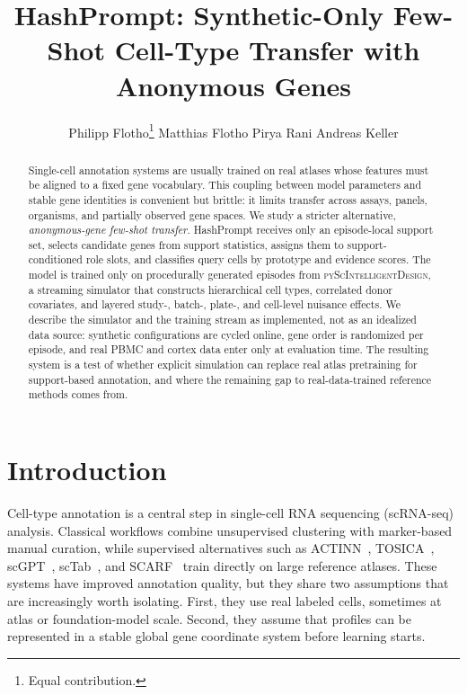 \documentclass{article}
\title{HashPrompt: Synthetic-Only Few-Shot Cell-Type Transfer with Anonymous Genes}
\author{%
  Philipp Flotho\thanks{Equal contribution.}
  \And
  Matthias Flotho\footnotemark[1]
  \And
  Pirya Rani
  \And
  Andreas Keller
}
\begin{document}
\maketitle

\begin{abstract}
Single-cell annotation systems are usually trained on real atlases whose features must be aligned to a fixed gene vocabulary. This coupling between model parameters and stable gene identities is convenient but brittle: it limits transfer across assays, panels, organisms, and partially observed gene spaces. We study a stricter alternative, \emph{anonymous-gene few-shot transfer}. HashPrompt receives only an episode-local support set, selects candidate genes from support statistics, assigns them to support-conditioned role slots, and classifies query cells by prototype and evidence scores. The model is trained only on procedurally generated episodes from \textsc{pyScIntelligentDesign}, a streaming simulator that constructs hierarchical cell types, correlated donor covariates, and layered study-, batch-, plate-, and cell-level nuisance effects. We describe the simulator and the training stream as implemented, not as an idealized data source: synthetic configurations are cycled online, gene order is randomized per episode, and real PBMC and cortex data enter only at evaluation time. The resulting system is a test of whether explicit simulation can replace real atlas pretraining for support-based annotation, and where the remaining gap to real-data-trained reference methods comes from.
\end{abstract}

\section{Introduction}

Cell-type annotation is a central step in single-cell RNA sequencing (scRNA-seq) analysis. Classical workflows combine unsupervised clustering with marker-based manual curation, while supervised alternatives such as ACTINN~\cite{ma2020actinn}, TOSICA~\cite{chen2023transformer}, scGPT~\cite{cui2024scgpt}, scTab~\cite{fischer2024sctab}, and SCARF~\cite{liu2025scarf} train directly on large reference atlases. These systems have improved annotation quality, but they share two assumptions that are increasingly worth isolating. First, they use real labeled cells, sometimes at atlas or foundation-model scale. Second, they assume that profiles can be represented in a stable global gene coordinate system before learning starts.
\end{document}
